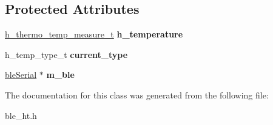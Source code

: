 \subsection*{Protected Attributes}
\begin{DoxyCompactItemize}
\item 
\hypertarget{classble_health_thermometer_a304c8cc2d2d72a83aad6b7e838366db4}{\hyperlink{structh__thermo__temp__measure__t}{h\-\_\-thermo\-\_\-temp\-\_\-measure\-\_\-t} {\bfseries h\-\_\-temperature}}\label{classble_health_thermometer_a304c8cc2d2d72a83aad6b7e838366db4}

\item 
\hypertarget{classble_health_thermometer_ac35c467f82127fd980fdea015b85f533}{h\-\_\-temp\-\_\-type\-\_\-t {\bfseries current\-\_\-type}}\label{classble_health_thermometer_ac35c467f82127fd980fdea015b85f533}

\item 
\hypertarget{classble_health_thermometer_a800ed78774e984051f9d3c3b2036d1b8}{\hyperlink{classble_serial}{ble\-Serial} $\ast$ {\bfseries m\-\_\-ble}}\label{classble_health_thermometer_a800ed78774e984051f9d3c3b2036d1b8}

\end{DoxyCompactItemize}


The documentation for this class was generated from the following file\-:\begin{DoxyCompactItemize}
\item 
ble\-\_\-ht.\-h\end{DoxyCompactItemize}
